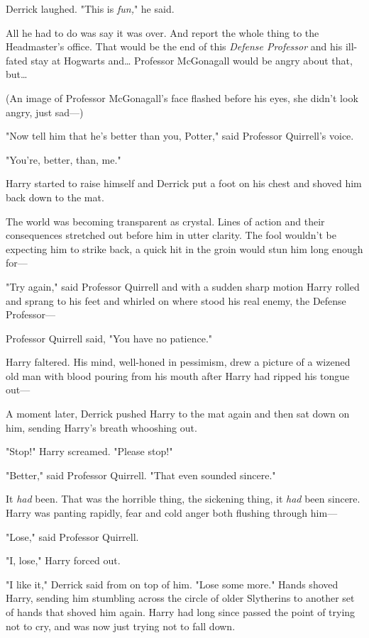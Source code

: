 Derrick laughed. "This is \emph{fun,}" he said.

All he had to do was say it was over. And report the whole thing to the 
Headmaster's office. That would be the end of this \emph{Defense Professor} and 
his ill-fated stay at Hogwarts and{\ldots} Professor McGonagall would be angry 
about that, but{\ldots}

(An image of Professor McGonagall's face flashed before his eyes, she didn't 
look angry, just sad---)

"Now tell him that he's better than you, Potter," said Professor Quirrell's 
voice.

"You're, better, than, me."

Harry started to raise himself and Derrick put a foot on his chest and shoved 
him back down to the mat.

The world was becoming transparent as crystal. Lines of action and their 
consequences stretched out before him in utter clarity. The fool wouldn't be 
expecting him to strike back, a quick hit in the groin would stun him long 
enough for---

"Try again," said Professor Quirrell and with a sudden sharp motion Harry 
rolled and sprang to his feet and whirled on where stood his real enemy, the 
Defense Professor---

Professor Quirrell said, "You have no patience."

Harry faltered. His mind, well-honed in pessimism, drew a picture of a wizened 
old man with blood pouring from his mouth after Harry had ripped his tongue 
out---

A moment later, Derrick pushed Harry to the mat again and then sat down on him, 
sending Harry's breath whooshing out.

"Stop!" Harry screamed. "Please stop!"

"Better," said Professor Quirrell. "That even sounded sincere."

It \emph{had} been. That was the horrible thing, the sickening thing, it 
\emph{had} been sincere. Harry was panting rapidly, fear and cold anger both 
flushing through him---

"Lose," said Professor Quirrell.

"I, lose," Harry forced out.

"I like it," Derrick said from on top of him. "Lose some more."
\sbreak
Hands shoved Harry, sending him stumbling across the circle of older Slytherins 
to another set of hands that shoved him again. Harry had long since passed the 
point of trying not to cry, and was now just trying not to fall down.


